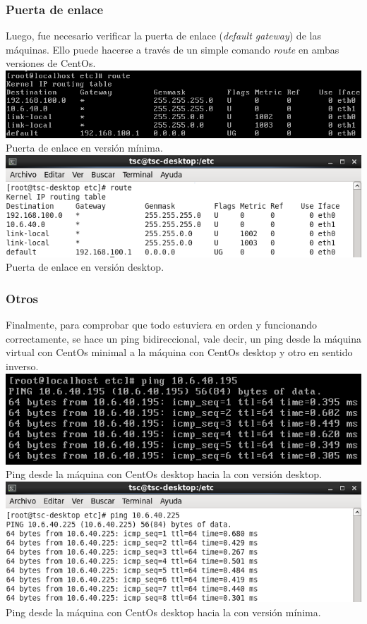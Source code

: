 \documentclass[11pt]{article}
\begin{document}
\subsubsection{Puerta de enlace}
	Luego, fue necesario verificar la puerta de enlace (\textit{default gateway}) de las máquinas. Ello puede hacerse a través de un simple comando \textit{route} en ambas versiones de CentOs.\\

\includegraphics[width=.75\linewidth]{screenshots/minimal/route.png}
    \\Puerta de enlace en versión mínima.\\

\includegraphics[width=.75\linewidth]{screenshots/desktop/route.png}
    \\Puerta de enlace en versión desktop.
\newpage
\subsubsection{Otros}
    Finalmente, para comprobar que todo estuviera en orden y funcionando correctamente, se hace un ping bidireccional, vale decir, un ping desde la máquina virtual con CentOs minimal a la máquina con CentOs desktop y otro en sentido inverso.\\
    
\includegraphics[width=.75\linewidth]{screenshots/minimal/ping-to-desktop.png}
    \\Ping desde la máquina con CentOs desktop hacia la con versión desktop.\\
    
\includegraphics[width=.75\linewidth]{screenshots/desktop/ping-to-min.png}
    \\Ping desde la máquina con CentOs desktop hacia la con versión mínima.\\    
    
\end{document}
